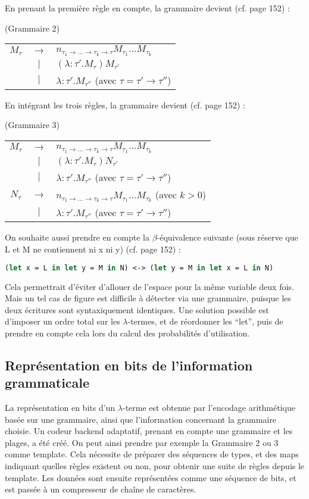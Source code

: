 \documentclass[titlepage]{article}
\begin{document}
En prenant la première règle en compte, la grammaire devient (cf. page 152) :
\begin{center}
    (Grammaire 2)
   \begin{tabular}{ c c l }
     $M_\tau$ & $\to$ & $n_{\tau_1 \to \dots \to \tau_k \to \tau}M_{\tau_1}\dots M_{\tau_k}$ \\
     & $\vert$ & $(\lambda : \tau' .M_{\tau})M_{\tau'}$ \\
     & $\vert$ & $\lambda : \tau' .M_{\tau''}$ (avec $\tau = \tau' \to \tau''$)\\
   \end{tabular}
 \end{center}
En intégrant les trois règles, la grammaire devient (cf. page 152) :
\begin{center}
    (Grammaire 3)
   \begin{tabular}{ c c l }
     $M_\tau$ & $\to$ & $n_{\tau_1 \to \dots \to \tau_k \to \tau}M_{\tau_1}\dots M_{\tau_k}$ \\
     & $\vert$ & $(\lambda : \tau' .M_{\tau})N_{\tau'}$ \\
     & $\vert$ & $\lambda : \tau' .M_{\tau''}$ (avec $\tau = \tau' \to \tau''$)\\
     $N_\tau$ & $\to$ & $n_{\tau_1 \to \dots \to \tau_k \to \tau}M_{\tau_1}\dots M_{\tau_k}$ (avec $k > 0$)\\
     & $\vert$ & $\lambda : \tau' .M_{\tau''}$ (avec $\tau = \tau' \to \tau''$)\\
   \end{tabular}
 \end{center}
On souhaite aussi prendre en compte la $\beta$-équivalence suivante (sous réserve que L et M ne contiennent ni x ni y) (cf. page 152) :
\begin{lstlisting}[language=Caml]
(let x = L in let y = M in N) <-> (let y = M in let x = L in N)
\end{lstlisting} 
Cela permettrait d'éviter d'allouer de l'espace pour la même variable deux fois. Mais un tel cas de figure est difficile à détecter via une grammaire, puisque les deux écritures sont syntaxiquement identiques. Une solution possible est d'imposer un ordre total sur les $\lambda$-termes, et de réordonner les ``let'', puis de prendre en compte cela lors du calcul des probabilités d'utilisation.

\subsection{Représentation en bits de l'information grammaticale}
La représentation en bits d'un $\lambda$-terme est obtenue par l'encodage arithmétique basée sur une grammaire, ainsi que l'information concernant la grammaire choisie. Un codeur backend adaptatif, prenant en compte une grammaire et les plages, a été créé. On peut ainsi prendre par exemple la Grammaire 2 ou 3 comme template. Cela nécessite de préparer des séquences de types, et des maps indiquant quelles règles existent ou non, pour obtenir une suite de règles depuis le template. Les données sont ensuite représentées comme une séquence de bits, et est passée à un compresseur de chaîne de caractères.
\end{document}
